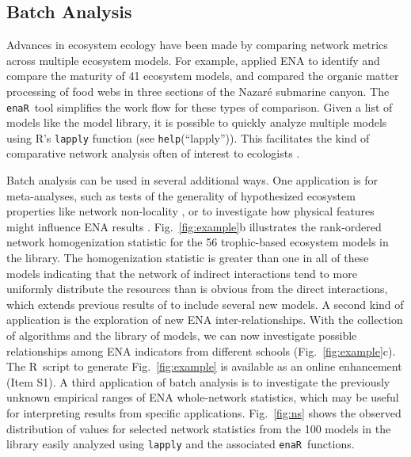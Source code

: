 \documentclass[11pt]{article}
\newcommand{\R}{R}
\newcommand{\enaR}{\texttt{enaR}}
\begin{document}
\begin{spacing}{2}
\subsection{Batch Analysis}
Advances in ecosystem ecology have been made by comparing network
metrics across multiple ecosystem models. For example,
\citet{christensen95} applied ENA to identify and compare the maturity
of 41 ecosystem models, and \citet{vanoevelen2011canyon} compared the
organic matter processing of food webs in three sections of the
Nazar{\'e} submarine canyon.  The \enaR\ tool simplifies the work flow
for these types of comparison. Given a list of models like the model
library, it is possible to quickly analyze multiple models using R's
\texttt{lapply} function (see \texttt{help}(``lapply'')).  This
facilitates the kind of comparative network analysis often of interest
to ecologists \citep{monaco97,christian05_cnea, whipple07}.

Batch analysis can be used in several additional ways.  One
application is for meta-analyses, such as tests of the generality of
hypothesized ecosystem properties like network non-locality
\citep{salas11_did}, %
or to investigate how physical features might influence ENA results
\citep{niquil2012physical}. Fig.~\ref{fig:example}b illustrates the
rank-ordered network homogenization statistic for the 56 trophic-based
ecosystem models in the library. The homogenization statistic is
greater than one in all of these models indicating that the network of
indirect interactions tend to more uniformly distribute the resources
than is obvious from the direct interactions, which extends previous
results of \citet{borrett10_hmg} to include several new models.  A
second kind of application is the exploration of new ENA
inter-relationships.  With the collection of algorithms and the
library of models, we can now investigate possible relationships among
ENA indicators from different schools (Fig.~\ref{fig:example}c). The
\R\ script to generate Fig.~\ref{fig:example} is available as an
online enhancement (Item S1).  A third application of batch analysis
is to investigate the previously unknown empirical ranges of ENA
whole-network statistics, which may be useful for interpreting results
from specific applications.  Fig.~\ref{fig:ns} shows the observed
distribution of values for selected network statistics from the 100
models in the library easily analyzed using \texttt{lapply} and the
associated \enaR\ functions.



\end{spacing}
\end{document}
